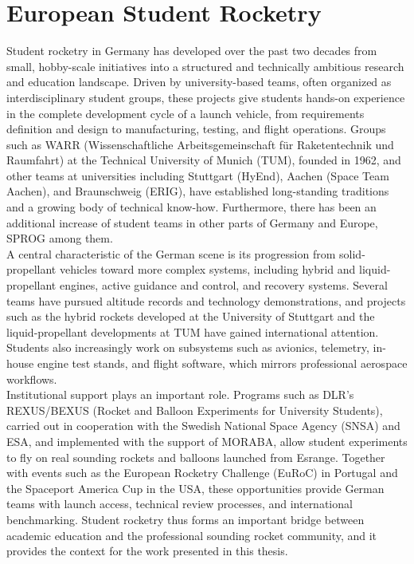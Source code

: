 \documentclass[fontsize=11pt,%
twoside,%
BCOR          = 8mm, %
DIV           = 11,  %
titlepage     = off,%
index=totoc,%
xcolor        = pdftex,%
dvipsnames,%
bibliography  = totoc,%
bibliography = numbered, %
listof        = notnumbered]{scrreprt}
\begin{document}
\section{European Student Rocketry}\label{sec:Student_Rocketry}
Student rocketry in Germany has developed over the past two decades from small, hobby-scale initiatives into a structured and technically ambitious research and education landscape. Driven by university-based teams, often organized as interdisciplinary student groups, these projects give students hands-on experience in the complete development cycle of a launch vehicle, from requirements definition and design to manufacturing, testing, and flight operations. Groups such as WARR (Wissenschaftliche Arbeitsgemeinschaft für Raketentechnik und Raumfahrt) at the Technical University of Munich (TUM), founded in 1962, and other teams at universities including Stuttgart (HyEnd), Aachen (Space Team Aachen), and Braunschweig (ERIG), have established long-standing traditions and a growing body of technical know-how.
Furthermore, there has been an additional increase of student teams in other parts of Germany and Europe, SPROG among them.\\
A central characteristic of the German scene is its progression from solid-propellant vehicles toward more complex systems, including hybrid and liquid-propellant engines, active guidance and control, and recovery systems. Several teams have pursued altitude records and technology demonstrations, and projects such as the hybrid rockets developed at the University of Stuttgart and the liquid-propellant developments at TUM have gained international attention. Students also increasingly work on subsystems such as avionics, telemetry, in-house engine test stands, and flight software, which mirrors professional aerospace workflows.\\
Institutional support plays an important role. Programs such as DLR's REXUS/BEXUS (Rocket and Balloon Experiments for University Students), carried out in cooperation with the Swedish National Space Agency (SNSA) and ESA, and implemented with the support of MORABA, allow student experiments to fly on real sounding rockets and balloons launched from Esrange. Together with events such as the European Rocketry Challenge (EuRoC) in Portugal and the Spaceport America Cup in the USA, these opportunities provide German teams with launch access, technical review processes, and international benchmarking. Student rocketry thus forms an important bridge between academic education and the professional sounding rocket community, and it provides the context for the work presented in this thesis.\\
\end{document}
